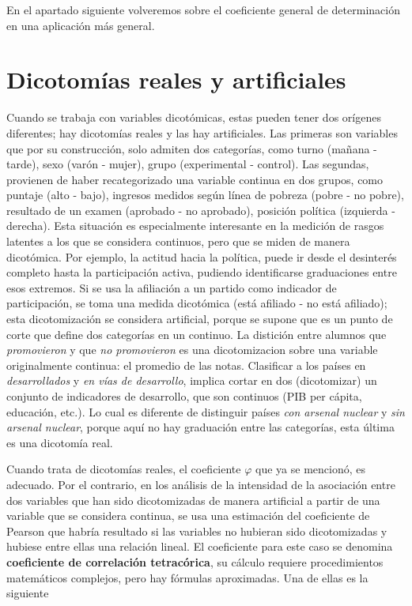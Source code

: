 \documentclass[]{book}
\begin{document}
En el apartado siguiente volveremos sobre el coeficiente general de
determinación en una aplicación más general.

\hypertarget{dicotomias-reales-y-artificiales}{%
\section{Dicotomías reales y artificiales}\label{dicotomias-reales-y-artificiales}}

Cuando se trabaja con variables dicotómicas, estas pueden tener dos
orígenes diferentes; hay dicotomías reales y las hay artificiales. Las primeras son variables que por su construcción, solo admiten dos
categorías, como turno (mañana - tarde), sexo (varón - mujer), grupo
(experimental - control). Las segundas, provienen de haber
recategorizado una variable continua en dos grupos, como puntaje (alto - bajo), ingresos medidos según línea de pobreza (pobre - no pobre), resultado de un examen (aprobado - no aprobado), posición política (izquierda - derecha). Esta situación es especialmente interesante en la medición de rasgos latentes a los que se considera continuos, pero que se miden de manera dicotómica. Por ejemplo, la actitud hacia la política, puede ir desde el desinterés completo hasta la participación activa, pudiendo identificarse graduaciones entre esos extremos. Si se usa la afiliación a un partido como indicador de participación, se toma una medida dicotómica (está afiliado - no está afiliado); esta dicotomización se considera artificial, porque se supone que es un punto de corte que define dos categorías en un continuo. La distición entre alumnos que \emph{promovieron} y que \emph{no promovieron} es una dicotomizacion sobre una variable originalmente continua: el promedio de las notas. Clasificar a los países en \emph{desarrollados} y \emph{en vías de desarrollo}, implica cortar en dos (dicotomizar) un conjunto de indicadores de desarrollo, que son continuos (PIB per cápita, educación, etc.). Lo cual es diferente de distinguir países \emph{con arsenal nuclear} y \emph{sin arsenal nuclear}, porque aquí no hay graduación entre las categorías, esta última es una dicotomía real.

Cuando trata de dicotomías reales, el coeficiente \(\varphi\) que ya se mencionó, es adecuado. Por el contrario, en los análisis de la intensidad de la asociación entre dos variables que han sido dicotomizadas de manera artificial a partir de una variable que se considera continua, se usa una estimación del coeficiente de Pearson que habría resultado si las variables no hubieran sido dicotomizadas y hubiese entre ellas una
relación lineal. El coeficiente para este caso se denomina \textbf{coeficiente de correlación tetracórica}, su cálculo requiere procedimientos matemáticos complejos, pero hay fórmulas aproximadas. Una de ellas es la siguiente
\end{document}
